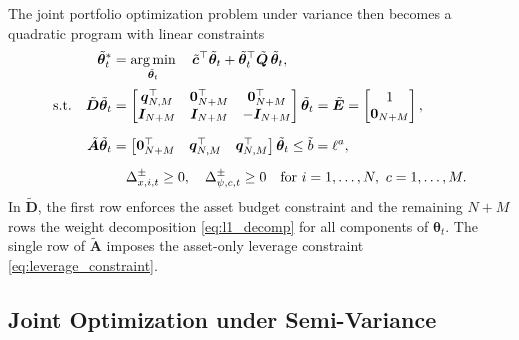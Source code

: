 The joint portfolio optimization problem under variance then becomes a quadratic program with linear constraints
\begin{equation} \label{eq:var_joint_qp}
\begin{aligned}
    \tilde{\bm{\theta}}_t^* &= \operatorname*{arg\,min}_{\tilde{\bm{\theta}}_t} \quad
    \tilde{\bm{c}}^\top \tilde{\bm{\theta}}_t + \tilde{\bm{\theta}}_t^\top \tilde{\bm{Q}}\, \tilde{\bm{\theta}}_t, \\[2pt]
    \text{s.t.} \quad
    \tilde{\bm{D}} \tilde{\bm{\theta}}_t &=
    \begin{bmatrix} \bm{q}_{N,M}^\top & \bm{0}_{N+M}^\top & \bm{0}_{N+M}^\top \\
    \bm{I}_{N+M} & \bm{I}_{N+M} & -\bm{I}_{N+M} \end{bmatrix} \tilde{\bm{\theta}}_t
    = \tilde{\bm{E}} = \begin{bmatrix} 1 \\ \bm{0}_{N+M} \end{bmatrix}, \\[6pt]
    \tilde{\bm{A}} \tilde{\bm{\theta}}_t &=
    \begin{bmatrix} \bm{0}_{N+M}^\top & \bm{q}_{N,M}^\top & \bm{q}_{N,M}^\top \end{bmatrix} \tilde{\bm{\theta}}_t
    \le \tilde{b} = \ell^a, \\[6pt]
    & \quad \Delta_{x,i,t}^\pm \ge 0,\quad \Delta_{\psi,c,t}^\pm \ge 0
    \quad \text{for } i = 1, \dots, N,\ c = 1, \dots, M.
\end{aligned}
\end{equation}
In $\tilde{\bm{D}}$, the first row enforces the asset budget constraint and the remaining $N+M$ rows the weight
decomposition \eqref{eq:l1_decomp} for all components of $\bm{\theta}_t$. The single row of $\tilde{\bm{A}}$ imposes
the asset-only leverage constraint \eqref{eq:leverage_constraint}.

\subsection{Joint Optimization under Semi-Variance} \label{app:mv_svar_joint}

